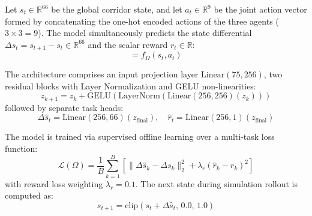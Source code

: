 Let $s_t \in \mathbb{R}^{66}$ be the global corridor state, and let $a_t \in \mathbb{R}^9$ be the joint action vector formed by concatenating the one-hot encoded actions of the three agents ($3 \times 3 = 9$). The model simultaneously predicts the state differential $\Delta s_t = s_{t+1} - s_t \in \mathbb{R}^{66}$ and the scalar reward $r_t \in \mathbb{R}$:
\begin{equation}
[\Delta \hat{s}_t, \, \hat{r}_t] = f_\Omega(s_t, a_t)
\end{equation}

The architecture comprises an input projection layer $\text{Linear}(75, 256)$, two residual blocks with Layer Normalization and GELU non-linearities:
\begin{equation}
z_{k+1} = z_k + \text{GELU}(\text{LayerNorm}(\text{Linear}(256, 256)(z_k)))
\end{equation}
followed by separate task heads:
\begin{equation}
\Delta \hat{s}_t = \text{Linear}(256, 66)(z_{\text{final}}), \quad \hat{r}_t = \text{Linear}(256, 1)(z_{\text{final}})
\end{equation}

The model is trained via supervised offline learning over a multi-task loss function:
\begin{equation}
\mathcal{L}(\Omega) = \frac{1}{B} \sum_{k=1}^B \left[ \|\Delta \hat{s}_k - \Delta s_k\|_2^2 + \lambda_r (\hat{r}_k - r_k)^2 \right]
\end{equation}
with reward loss weighting $\lambda_r = 0.1$. The next state during simulation rollout is computed as:
\begin{equation}
s_{t+1} = \text{clip}(s_t + \Delta \hat{s}_t, \, 0.0, \, 1.0)
\end{equation}

